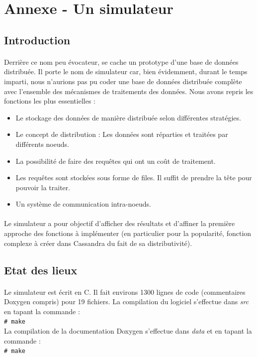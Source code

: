 \documentclass[12pt]{article}
\newcommand{\shellcmd}[1]{\\\indent\indent\texttt{\footnotesize\# #1}\\}
\begin{document}
\newpage

\section{Annexe - Un simulateur}

\subsection{Introduction}

\paragraph{}Derrière ce nom peu évocateur, se cache un prototype d'une base de données distribuée. Il porte le nom de simulateur car, bien évidemment, durant le temps imparti, nous n'aurions pas pu coder une base de données distribuée complète avec l'ensemble des mécanismes de traitements des données. Nous avons repris les fonctions les plus essentielles :

\begin{itemize}
    \item Le stockage des données de manière distribuée selon différentes stratégies.
    \item Le concept de distribution : Les données sont réparties et traitées par différents noeuds.
    \item La possibilité de faire des requêtes qui ont un coût de traitement.
    \item Les requêtes sont stockées sous forme de files. Il suffit de prendre la tête pour pouvoir la traiter.
    \item Un système de communication intra-noeuds.
\end{itemize}

\paragraph{}Le simulateur a pour objectif d'afficher des résultats et d'affiner la première approche des fonctions à implémenter (en particulier pour la popularité, fonction complexe à créer dans Cassandra du fait de sa distributivité).

\subsection{Etat des lieux}

\paragraph{} Le simulateur est écrit en C. Il fait environs 1300 lignes de code (commentaires Doxygen compris) pour 19 fichiers. La compilation du logiciel s'effectue dans \textit{src} en tapant la commande  : \shellcmd{make}
La compilation de la documentation Doxygen s'effectue dans \textit{data} et en tapant la commande : \shellcmd{make}
\end{document}
